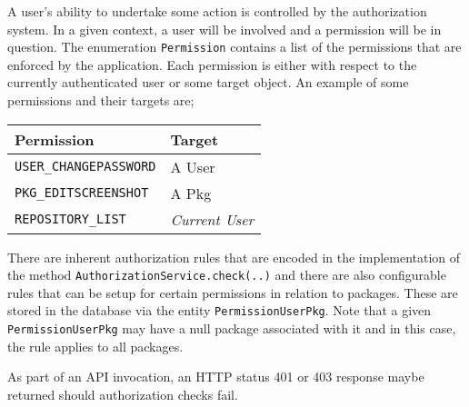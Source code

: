 A user's ability to undertake some action is controlled by the authorization system.  In a given context, a user will be involved and a permission will be in question.  The enumeration {\tt Permission} contains a list of the permissions that are enforced by the application.  Each permission is either with respect to the currently authenticated user or some target object.  An example of some permissions and their targets are;

\begin{tabular}{ | l | l | }
\hline
Permission & Target \\
\hline
{\tt USER\_CHANGEPASSWORD} & A User \\
{\tt PKG\_EDITSCREENSHOT} & A Pkg \\
{\tt REPOSITORY\_LIST} & {\it Current User} \\
\hline
\end{tabular}

There are inherent authorization rules that are encoded in the implementation of the method {\tt AuthorizationService.check(..)} and there are also configurable rules that can be setup for certain permissions in relation to packages.  These are stored in the database via the entity {\tt PermissionUserPkg}.  Note that a given {\tt PermissionUserPkg} may have a null package associated with it and in this case, the rule applies to all packages.

As part of an API invocation, an HTTP status 401 or 403 response maybe returned should authorization checks fail.
